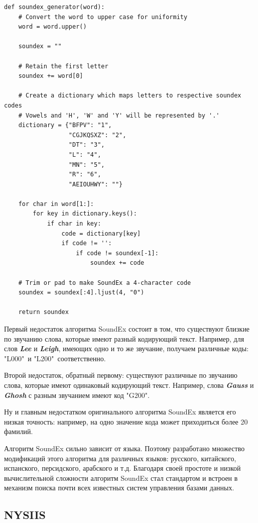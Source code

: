 \documentclass[titlepage,12pt]{article}
\begin{document}
\begin{verbatim}
def soundex_generator(word):
    # Convert the word to upper case for uniformity
    word = word.upper()

    soundex = ""

    # Retain the first letter
    soundex += word[0]

    # Create a dictionary which maps letters to respective soundex codes
    # Vowels and 'H', 'W' and 'Y' will be represented by '.'
    dictionary = {"BFPV": "1", 
                  "CGJKQSXZ": "2",
                  "DT": "3",
                  "L": "4", 
                  "MN": "5", 
                  "R": "6",
                  "AEIOUHWY": ""}

    for char in word[1:]:
        for key in dictionary.keys():
            if char in key:
                code = dictionary[key]
                if code != '':
                    if code != soundex[-1]:
                        soundex += code

    # Trim or pad to make SoundEx a 4-character code
    soundex = soundex[:4].ljust(4, "0")

    return soundex
\end{verbatim}

Первый недостаток алгоритма SoundEx состоит в том, что существуют близкие
по звучанию слова, которые имеют разный кодирующий текст. Например, для слов \textit{\textbf{Lee}} и \textit{\textbf{Leigh}}, имеющих одно и то
же звучание, получаем различные коды: "L000"\ и "L200"\ соответственно.

Второй недостаток, обратный первому: существуют различные по звучанию слова, которые имеют одинаковый кодирующий текст. Например, слова \textit{\textbf{Gauss}} и \textit{\textbf{Ghosh}} с разным звучанием имеют код "G200".

Ну и главным недостатком оригинального алгоритма SoundEx является его низкая точность: например, на одно значение кода может приходиться более 20 фамилий.

Алгоритм SoundEx сильно зависит от языка. Поэтому разработано множество модификаций этого алгоритма для различных языков: русского, китайского, испанского, персидского,
арабского и т.д. Благодаря своей простоте и низкой вычислительной сложности алгоритм SoundEx стал стандартом и встроен в механизм поиска почти
всех известных систем управления базами данных.

\subsection{NYSIIS}
\end{document}
